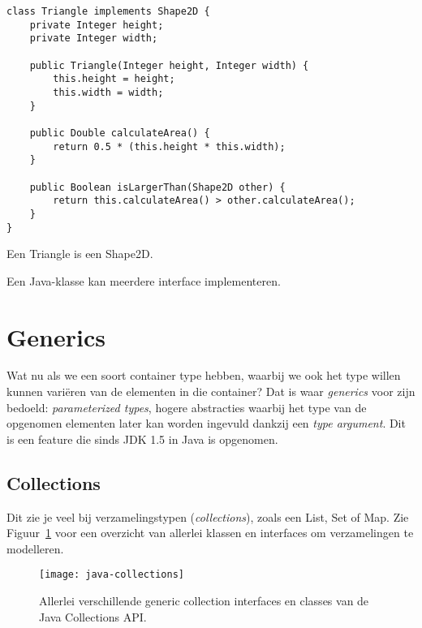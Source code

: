\begin{listing}[H]
\begin{verbatim}
class Triangle implements Shape2D {
    private Integer height;
    private Integer width;

    public Triangle(Integer height, Integer width) {
        this.height = height;
        this.width = width;
    }

    public Double calculateArea() {
        return 0.5 * (this.height * this.width);
    }

    public Boolean isLargerThan(Shape2D other) {
        return this.calculateArea() > other.calculateArea();
    }
}
\end{verbatim}
\caption{Een Triangle is een Shape2D.}
\label{code:triangle}
\end{listing}

Een Java-klasse kan meerdere interface implementeren.

\section{Generics}
Wat nu als we een soort container type hebben, waarbij we 
ook het type willen kunnen variëren van de elementen in die container?
Dat is waar \textit{generics} voor zijn bedoeld: \textit{parameterized types}, 
hogere abstracties waarbij het type van de 
opgenomen elementen later kan worden ingevuld dankzij een \textit{type argument}.
Dit is een feature die sinds JDK 1.5 in Java is opgenomen.

\subsection{Collections}
Dit zie je veel bij verzamelingstypen (\textit{collections}), zoals een List, Set of Map.
Zie Figuur~\ref{fig:java-collections} voor een overzicht van allerlei klassen en interfaces
om verzamelingen te modelleren.

\begin{figure}[H]
    \centering
    \texttt{[image: java-collections]}
    \caption{Allerlei verschillende generic collection interfaces en classes van de Java Collections API.}
    \label{fig:java-collections}
\end{figure}

